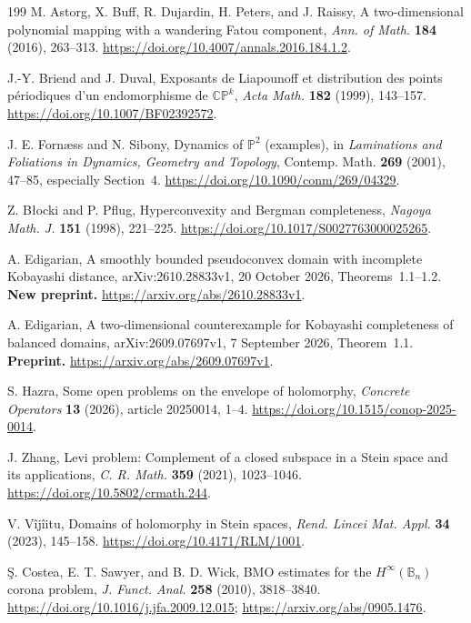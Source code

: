 \documentclass[11pt,reqno]{amsart}
\theoremstyle{definition}
\theoremstyle{remark}
\begin{document}
\begin{thebibliography}{199}
 M. Astorg, X. Buff, R. Dujardin, H. Peters, and J. Raissy, A two-dimensional polynomial mapping with a wandering Fatou component, \emph{Ann. of Math.} \textbf{184} (2016), 263--313. \url{https://doi.org/10.4007/annals.2016.184.1.2}.

 J.-Y. Briend and J. Duval, Exposants de Liapounoff et distribution des points p\'eriodiques d'un endomorphisme de $\mathbb{CP}^k$, \emph{Acta Math.} \textbf{182} (1999), 143--157. \url{https://doi.org/10.1007/BF02392572}.

 J. E. Forn\ae ss and N. Sibony, Dynamics of $\mathbb P^2$ (examples), in \emph{Laminations and Foliations in Dynamics, Geometry and Topology}, Contemp. Math. \textbf{269} (2001), 47--85, especially Section~4. \url{https://doi.org/10.1090/conm/269/04329}.

 Z. B\l ocki and P. Pflug, Hyperconvexity and Bergman completeness, \emph{Nagoya Math. J.} \textbf{151} (1998), 221--225. \url{https://doi.org/10.1017/S0027763000025265}.

 A. Edigarian, A smoothly bounded pseudoconvex domain with incomplete Kobayashi distance, arXiv:2610.28833v1, 20 October 2026, Theorems~1.1--1.2. \textbf{New preprint.} \url{https://arxiv.org/abs/2610.28833v1}.

 A. Edigarian, A two-dimensional counterexample for Kobayashi completeness of balanced domains, arXiv:2609.07697v1, 7 September 2026, Theorem~1.1. \textbf{Preprint.} \url{https://arxiv.org/abs/2609.07697v1}.

 S. Hazra, Some open problems on the envelope of holomorphy, \emph{Concrete Operators} \textbf{13} (2026), article 20250014, 1--4. \url{https://doi.org/10.1515/conop-2025-0014}.

 J. Zhang, Levi problem: Complement of a closed subspace in a Stein space and its applications, \emph{C. R. Math.} \textbf{359} (2021), 1023--1046. \url{https://doi.org/10.5802/crmath.244}.

 V. V\^ij\^iitu, Domains of holomorphy in Stein spaces, \emph{Rend. Lincei Mat. Appl.} \textbf{34} (2023), 145--158. \url{https://doi.org/10.4171/RLM/1001}.

 \c S. Costea, E. T. Sawyer, and B. D. Wick, BMO estimates for the $H^\infty(\mathbb B_n)$ corona problem, \emph{J. Funct. Anal.} \textbf{258} (2010), 3818--3840. \url{https://doi.org/10.1016/j.jfa.2009.12.015}; \url{https://arxiv.org/abs/0905.1476}.


\end{thebibliography}
\end{document}
